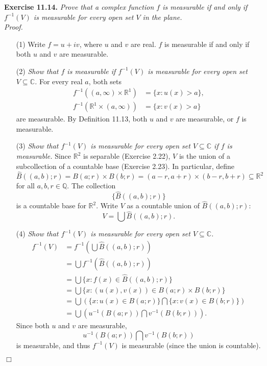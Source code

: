 \documentclass{article}
\begin{document}



\textbf{Exercise 11.14.}
\emph{Prove that a complex function $f$ is measurable
if and only if $f^{-1}(V)$ is measurable for every open set $V$ in the plane.} \\

\emph{Proof.}
\begin{enumerate}
\item[(1)]
  Write $f=u+iv$, where $u$ and $v$ are real.
  $f$ is measurable if and only if both $u$ and $v$ are measurable.

\item[(2)]
  \emph{Show that $f$ is measurable
  if $f^{-1}(V)$ is measurable for every open set $V \subseteq \mathbb{C}$.}
  For every real $a$,
  both sets
  \begin{align*}
    f^{-1}((a,\infty) \times \mathbb{R}^1) &= \{ x : u(x) > a \}, \\
    f^{-1}(\mathbb{R}^1 \times (a,\infty)) &= \{ x : v(x) > a \}
  \end{align*}
  are measurable.
  By Definition 11.13, both $u$ and $v$ are measurable, or $f$ is measurable.

\item[(3)]
  \emph{Show that $f^{-1}(V)$ is measurable for every open set $V \subseteq \mathbb{C}$
  if $f$ is measurable.}
  Since $\mathbb{R}^2$ is separable (Exercise 2.22),
  $V$ is the union of a subcollection of a countable base (Exercise 2.23).
  In particular,
  define
  \[
    \widehat{B}((a,b);r)
    = B(a;r) \times B(b;r)
    = (a-r,a+r) \times (b-r,b+r)
    \subseteq \mathbb{R}^2
  \]
  for all $a, b, r \in \mathbb{Q}$.
  The collection
  \[
    \{ \widehat{B}((a,b);r) \}
  \]
  is a countable base for $\mathbb{R}^2$.
  Write $V$ as a countable union of $\widehat{B}((a,b);r)$:
  \[
    V = \bigcup \widehat{B}((a,b);r).
  \]

\item[(4)]
  \emph{Show that $f^{-1}(V)$ is measurable for every open set $V \subseteq \mathbb{C}$.}
  \begin{align*}
    f^{-1}(V)
    &= f^{-1} \left( \bigcup \widehat{B}((a,b);r) \right) \\
    &= \bigcup f^{-1}(\widehat{B}((a,b);r)) \\
    &= \bigcup \{ x : f(x) \in \widehat{B}((a,b);r) \} \\
    &= \bigcup \{ x : (u(x), v(x)) \in B(a;r) \times B(b;r) \} \\
    &= \bigcup \left( \{ x : u(x) \in B(a;r) \} \bigcap \{ x : v(x) \in B(b;r) \} \right) \\
    &= \bigcup \left( u^{-1}(B(a;r)) \bigcap v^{-1}(B(b;r)) \right).
  \end{align*}
  Since both $u$ and $v$ are measurable,
  \[
    u^{-1}(B(a;r)) \bigcap v^{-1}(B(b;r))
  \]
  is measurable, and thus $f^{-1}(V)$ is measurable (since the union is countable).
\end{enumerate}
$\Box$ \\\\
\end{document}
